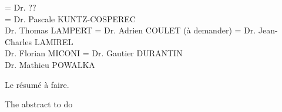 \documentclass[11pt]{template/thesul}
\begin{document}




\ThesisUL

\President={
    Dr. ??\\
}
\Rapporteurs ={
    Dr. Pascale KUNTZ-COSPEREC\\
    Dr. Thomas LAMPERT
}
\Examinateurs={
    Dr. Adrien COULET (à demander)
}
\Encadrants={
    Dr. Jean-Charles LAMIREL\\
    Dr. Florian MICONI
}
\Invites={
    Dr. Gautier DURANTIN\\
    Dr. Mathieu POWALKA
}

\MakeThesisTitlePage



\NumberAbstractPages
\begin{ThesisAbstract}

    \begin{FrenchAbstract}
        Le résumé à faire.
    \end{FrenchAbstract}

    \begin{EnglishAbstract}
        The abstract to do
    \end{EnglishAbstract}
\end{ThesisAbstract}

\end{document}
